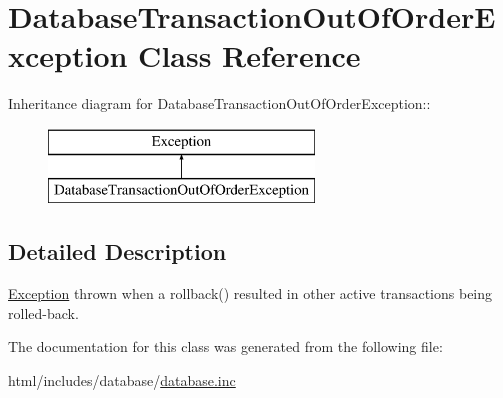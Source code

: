 \hypertarget{classDatabaseTransactionOutOfOrderException}{
\section{DatabaseTransactionOutOfOrderException Class Reference}
\label{classDatabaseTransactionOutOfOrderException}
}
Inheritance diagram for DatabaseTransactionOutOfOrderException::\begin{figure}[H]
\begin{center}
\leavevmode
\includegraphics[height=2cm]{classDatabaseTransactionOutOfOrderException}
\end{center}
\end{figure}


\subsection{Detailed Description}
\hyperlink{classException}{Exception} thrown when a rollback() resulted in other active transactions being rolled-\/back. 

The documentation for this class was generated from the following file:\begin{DoxyCompactItemize}
\item 
html/includes/database/\hyperlink{database_8inc}{database.inc}\end{DoxyCompactItemize}
